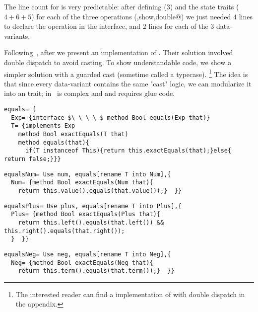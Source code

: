 The line count for \name is very predictable: after defining \Q@exp@ ($3$) and the state traits ($4+6+5$)
for each of the three operations (\Q@eval,show,double@) 
we just needed $4$ lines to declare the operation 
in the interface, and $2$ lines for each of the $3$ data-variants.

Following~\cite{Zenger-Odersky2005}, after \Q@double@ we present an implementation of \Q@equals@.
Their solution involved double dispatch to avoid casting.
To show understandable code, we show a simpler solution 
with a guarded cast (sometime called a typecase).%
\footnote{
The interested reader can find a \name implementation of \Q@equals@ with double dispatch
in the appendix.
}
The idea is that since every data-variant contains
 the same "cast" logic, 
 we can modularize it into an \Q@equals@ trait;
\Q@equals@ in~\cite{Zenger-Odersky2005} is complex and
 and requires glue code.
\saveSpace\saveSpace
\begin{lstlisting}
equals= {
  Exp= {interface $\ \ \ \ $ method Bool equals(Exp that)}
  T= {implements Exp
    method Bool exactEquals(T that)
    method equals(that){
      if(T instanceof This){return this.exactEquals(that);}else{ return false;}}}
\end{lstlisting}
\multiCode
\begin{lstlisting}
equalsNum= Use num, equals[rename T into Num],{
  Num= {method Bool exactEquals(Num that){
    return this.value().equals(that.value());}  }}
\end{lstlisting}
\multiCode
\begin{lstlisting}
equalsPlus= Use plus, equals[rename T into Plus],{
  Plus= {method Bool exactEquals(Plus that){
    return this.left().equals(that.left()) && this.right().equals(that.right());
  }  }}
\end{lstlisting}
\multiCode
\begin{lstlisting}
equalsNeg= Use neg, equals[rename T into Neg],{
  Neg= {method Bool exactEquals(Neg that){
    return this.term().equals(that.term());}  }}
\end{lstlisting}
\saveSpace\saveSpace

